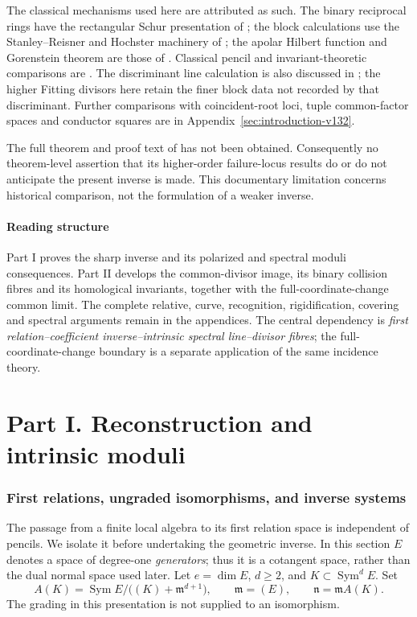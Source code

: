 \documentclass[11pt,reqno]{amsart}
\numberwithin{equation}{section}
\theoremstyle{definition}\newtheorem{definition}[theorem]{Definition}
\theoremstyle{remark}\newtheorem{remark}[theorem]{Remark}
\DeclareMathOperator{\Sym}{Sym}\DeclareMathOperator{\Gr}{Gr}
\begin{document}
The classical mechanisms used here are attributed as such. The
binary reciprocal rings have the rectangular Schur presentation
of \cite{Grinberg2019}; the block calculations use the
Stanley--Reisner and Hochster machinery of
\cite{MillerSturmfels2005}; the apolar Hilbert function and
Gorenstein theorem are those of \cite{ShafieiSymmetric}.
Classical pencil and invariant-theoretic comparisons are
\cite{FevolaMandelshtamSturmfels,MFK1994}. The discriminant line
calculation is also discussed in \cite{Krishna2026}; the higher
Fitting divisors here retain the finer block data not recorded by
that discriminant. Further comparisons with coincident-root
loci, tuple common-factor spaces and conductor squares are in
Appendix~\ref{sec:introduction-v132}.

The full theorem and proof text of \cite{Ballico93} has not been
obtained. Consequently no theorem-level assertion that its
higher-order failure-locus results do or do not anticipate the
present inverse is made. This documentary limitation concerns
historical comparison, not the formulation of a weaker inverse.

\subsection{Reading structure}
Part I proves the sharp inverse and its polarized and spectral
moduli consequences. Part II develops the common-divisor image,
its binary collision fibres and its homological invariants, together
with the full-coordinate-change common limit. The complete relative,
curve, recognition, rigidification, covering and spectral arguments
remain in the appendices. The central dependency is
\emph{first relation--coefficient inverse--intrinsic spectral
line--divisor fibres}; the full-coordinate-change boundary is a
separate application of the same incidence theory.

\part*{Part I. Reconstruction and intrinsic moduli}

\section{First relations, ungraded isomorphisms, and inverse systems}
\label{sec:first-relations-v147}

The passage from a finite local algebra to its first relation space is
independent of pencils.  We isolate it before undertaking the geometric
inverse.  In this section \(E\) denotes a space of degree-one
\emph{generators}; thus it is a cotangent space, rather than the dual
normal space used later.  Let \(e=\dim E\), \(d\ge2\), and
\(K\subset\Sym^d E\).  Set
\begin{equation}\label{eq:general-first-algebra-v147}
 A(K)=\Sym E/\bigl((K)+\mathfrak m^{d+1}\bigr),
 \qquad \mathfrak m=(E),\qquad \mathfrak n=\mathfrak m A(K).
\end{equation}
The grading in this presentation is not supplied to an isomorphism.
\end{document}
